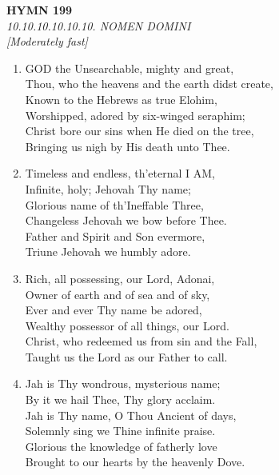 \documentclass[11pt,a4paper]{article}
\begin{document}
\newpage
\begin{center}
    {\Large \textbf{HYMN 199}}
    \\
    \textit{10.10.10.10.10.10. NOMEN DOMINI}
    \\
    \textit{\small [Moderately fast]}
\end{center}
\vspace{1em}

\begin{enumerate}
    \item GOD the Unsearchable, mighty and great, \\
        Thou, who the heavens and the earth didst create, \\
        Known to the Hebrews as true Elohim, \\
        Worshipped, adored by six-winged seraphim; \\
        Christ bore our sins when He died on the tree, \\
        Bringing us nigh by His death unto Thee.

    \item Timeless and endless, th'eternal I AM, \\
        Infinite, holy; Jehovah Thy name; \\
        Glorious name of th'Ineffable Three, \\
        Changeless Jehovah we bow before Thee. \\
        Father and Spirit and Son evermore, \\
        Triune Jehovah we humbly adore.

    \item Rich, all possessing, our Lord, Adonai, \\
        Owner of earth and of sea and of sky, \\
        Ever and ever Thy name be adored, \\
        Wealthy possessor of all things, our Lord. \\
        Christ, who redeemed us from sin and the Fall, \\
        Taught us the Lord as our Father to call.

    \item Jah is Thy wondrous, mysterious name; \\
        By it we hail Thee, Thy glory acclaim. \\
        Jah is Thy name, O Thou Ancient of days, \\
        Solemnly sing we Thine infinite praise. \\
        Glorious the knowledge of fatherly love \\
        Brought to our hearts by the heavenly Dove.


\end{enumerate}
\end{document}
